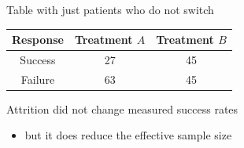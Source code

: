 \documentclass[ignorenonframetext,]{beamer}
\begin{document}
\begin{frame}{Table with just patients who do not switch}

\begin{longtable}[c]{@{}ccc@{}}
\toprule
\begin{minipage}[b]{0.15\columnwidth}\centering\strut
Response
\strut\end{minipage} &
\begin{minipage}[b]{0.22\columnwidth}\centering\strut
Treatment \(A\)
\strut\end{minipage} &
\begin{minipage}[b]{0.25\columnwidth}\centering\strut
Treatment \(B\)
\strut\end{minipage}\tabularnewline
\midrule
\endhead
\begin{minipage}[t]{0.15\columnwidth}\centering\strut
Success
\strut\end{minipage} &
\begin{minipage}[t]{0.22\columnwidth}\centering\strut
27
\strut\end{minipage} &
\begin{minipage}[t]{0.25\columnwidth}\centering\strut
45
\strut\end{minipage}\tabularnewline
\begin{minipage}[t]{0.15\columnwidth}\centering\strut
Failure
\strut\end{minipage} &
\begin{minipage}[t]{0.22\columnwidth}\centering\strut
63
\strut\end{minipage} &
\begin{minipage}[t]{0.25\columnwidth}\centering\strut
45
\strut\end{minipage}\tabularnewline
\bottomrule
\end{longtable}

Attrition did not change measured success rates

\begin{itemize}
\itemsep1pt\parskip0pt
\item
  but it does reduce the effective sample size
\end{itemize}

\end{frame}
\end{document}
